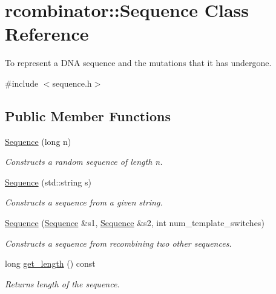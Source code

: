 \hypertarget{classrcombinator_1_1Sequence}{}\section{rcombinator\+:\+:Sequence Class Reference}
\label{classrcombinator_1_1Sequence}


To represent a D\+NA sequence and the mutations that it has undergone.  




{\ttfamily \#include $<$sequence.\+h$>$}

\subsection*{Public Member Functions}
\begin{DoxyCompactItemize}
\item 
\mbox{\hyperlink{classrcombinator_1_1Sequence_afab8bafaf1283f4e699ba9111ee452b3}{Sequence}} (long n)
\begin{DoxyCompactList}\small\item\em Constructs a random sequence of length {\itshape n}. \end{DoxyCompactList}\item 
\mbox{\hyperlink{classrcombinator_1_1Sequence_af5b3b62eba07f0e09f532fcf1681c289}{Sequence}} (std\+::string s)
\begin{DoxyCompactList}\small\item\em Constructs a sequence from a given string. \end{DoxyCompactList}\item 
\mbox{\hyperlink{classrcombinator_1_1Sequence_a976b331689ec55d9d306281bbff5d22d}{Sequence}} (\mbox{\hyperlink{classrcombinator_1_1Sequence}{Sequence}} \&s1, \mbox{\hyperlink{classrcombinator_1_1Sequence}{Sequence}} \&s2, int num\+\_\+template\+\_\+switches)
\begin{DoxyCompactList}\small\item\em Constructs a sequence from recombining two other sequences. \end{DoxyCompactList}\item 
\mbox{\label{classrcombinator_1_1Sequence_a690c3f7adffafdf45056b5ae632c515d}} 
long \mbox{\hyperlink{classrcombinator_1_1Sequence_a690c3f7adffafdf45056b5ae632c515d}{get\+\_\+length}} () const
\begin{DoxyCompactList}\small\item\em Returns length of the sequence. \end{DoxyCompactList}\item 

\end{DoxyCompactItemize}
